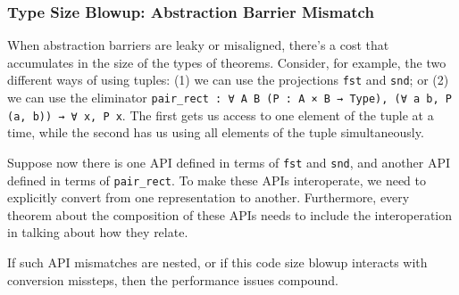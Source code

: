 \subsubsection{Type Size Blowup: Abstraction Barrier Mismatch}
When abstraction barriers are leaky or misaligned, there's a cost that accumulates in the size of the types of theorems.
Consider, for example, the two different ways of using tuples:
(1) we can use the projections \texttt{fst} and \texttt{snd}; or
(2) we can use the eliminator \texttt{pair_rect : ∀ A B (P : A × B → Type), (∀ a b, P (a, b)) → ∀ x, P x}.
The first gets us access to one element of the tuple at a time, while the second has us using all elements of the tuple simultaneously.

Suppose now there is one API defined in terms of \texttt{fst} and \texttt{snd}, and another API defined in terms of \texttt{pair_rect}.
To make these APIs interoperate, we need to explicitly convert from one representation to another.
Furthermore, every theorem about the composition of these APIs needs to include the interoperation in talking about how they relate.

If such API mismatches are nested, or if this code size blowup interacts with conversion missteps, then the performance issues compound.


